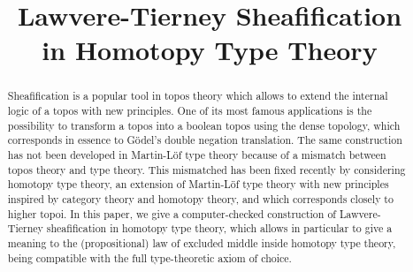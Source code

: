 \documentclass[conference]{IEEEtran}
\begin{document}
%
\title{Lawvere-Tierney Sheafification\\ in Homotopy Type Theory}


\author{
}



\maketitle

\begin{abstract}

  Sheafification is a popular tool in topos theory which
  allows to extend the internal logic of a topos with new
  principles. One of its most famous applications is the possibility
  to transform a topos into a boolean topos using the
  dense topology, which corresponds in essence to Gödel's double
  negation translation.
  The same construction has not been developed in Martin-Löf type
  theory because of a mismatch between topos theory and type theory. This
  mismatched has been fixed recently by considering homotopy type
  theory, an extension of Martin-Löf type theory with new
  principles inspired by category theory and homotopy theory, and
  which corresponds closely to higher topoi.
  In this paper, we give a computer-checked construction of
  Lawvere-Tierney sheafification in homotopy type theory, which allows
  in particular to give a meaning to the (propositional) law of
  excluded middle inside homotopy type theory, being
  compatible with the full type-theoretic axiom of choice.
  
\end{abstract}
\end{document}
